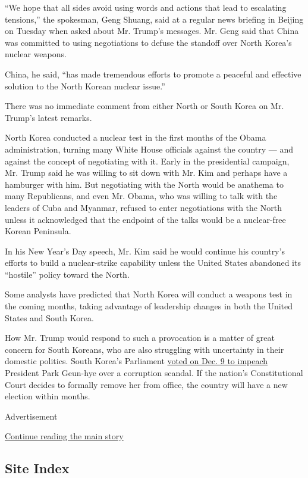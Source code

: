 ``We hope that all sides avoid using words and actions that lead to
escalating tensions,'' the spokesman, Geng Shuang, said at a regular
news briefing in Beijing on Tuesday when asked about Mr. Trump's
messages. Mr. Geng said that China was committed to using negotiations
to defuse the standoff over North Korea's nuclear weapons.

China, he said, ``has made tremendous efforts to promote a peaceful and
effective solution to the North Korean nuclear issue.''

There was no immediate comment from either North or South Korea on Mr.
Trump's latest remarks.

North Korea conducted a nuclear test in the first months of the Obama
administration, turning many White House officials against the country
--- and against the concept of negotiating with it. Early in the
presidential campaign, Mr. Trump said he was willing to sit down with
Mr. Kim and perhaps have a hamburger with him. But negotiating with the
North would be anathema to many Republicans, and even Mr. Obama, who was
willing to talk with the leaders of Cuba and Myanmar, refused to enter
negotiations with the North unless it acknowledged that the endpoint of
the talks would be a nuclear-free Korean Peninsula.

In his New Year's Day speech, Mr. Kim said he would continue his
country's efforts to build a nuclear-strike capability unless the United
States abandoned its ``hostile'' policy toward the North.

Some analysts have predicted that North Korea will conduct a weapons
test in the coming months, taking advantage of leadership changes in
both the United States and South Korea.

How Mr. Trump would respond to such a provocation is a matter of great
concern for South Koreans, who are also struggling with uncertainty in
their domestic politics. South Korea's Parliament
\href{https://www.nytimes3xbfgragh.onion/2016/12/09/world/asia/south-korea-president-park-geun-hye-impeached.html}{voted
on Dec. 9 to impeach} President Park Geun-hye over a corruption scandal.
If the nation's Constitutional Court decides to formally remove her from
office, the country will have a new election within months.

Advertisement

\protect\hyperlink{after-bottom}{Continue reading the main story}

\hypertarget{site-index}{%
\subsection{Site Index}\label{site-index}}

